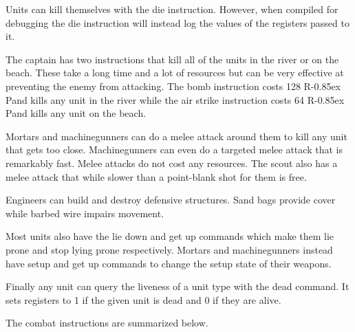 \documentclass{article}
\newcommand{\RP}{R\kern-0.85ex P}
\begin{document}
Units can kill themselves with the die instruction. However, when compiled for
debugging the die instruction will instead log the values of the registers
passed to it.

The captain has two instructions that kill all of the units in the river or on
the beach. These take a long time and a lot of resources but can be very
effective at preventing the enemy from attacking. The bomb instruction costs 128
\RP and kills any unit in the river while the air strike instruction costs 64
\RP and kills any unit on the beach.

Mortars and machinegunners can do a melee attack around them to kill any unit
that gets too close. Machinegunners can even do a targeted melee attack that
is remarkably fast. Melee attacks do not cost any resources. The scout also has
a melee attack that while slower than a point-blank shot for them is free.

Engineers can build and destroy defensive structures. Sand bags provide cover
while barbed wire impairs movement.

Most units also have the lie down and get up commands which make them lie prone
and stop lying prone respectively. Mortars and machinegunners instead have setup
and get up commands to change the setup state of their weapons.

Finally any unit can query the liveness of a unit type with the dead command. It
sets registers to 1 if the given unit is dead and 0 if they are alive.

The combat instructions are summarized below.
\end{document}
